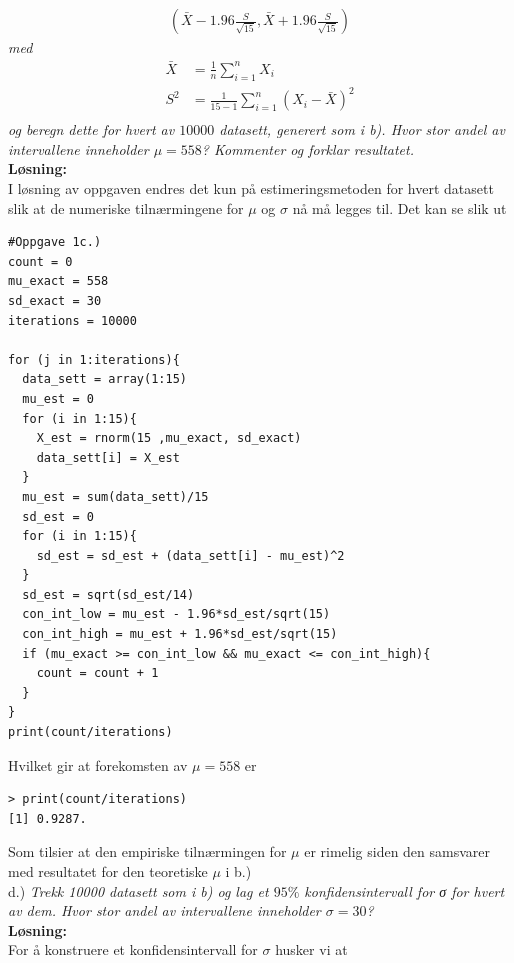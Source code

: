 \documentclass[12pt,
               a4paper,
               article,
               oneside,
               oldfontcommands,
               norsk]{memoir}
\begin{document}
\begin{align*}
    \left(\bar{X} - 1.96\frac{S}{\sqrt{15}},\bar{X} + 1.96\frac{S}{\sqrt{15}}  \right)
\end{align*}
\emph{med}
\begin{align*}
    \bar{X} &= \frac{1}{n} \sum_{i=1}^{n} X_{i} \\[5pt]
    S^2 &= \frac{1}{15 - 1} \sum_{i=1}^{n} \left(X_{i} - \bar{X} \right)^2 \\[5pt]
\end{align*}
\emph{og beregn dette for hvert av $10000$ datasett, generert som i b). Hvor stor andel av intervallene inneholder $\mu = 558$? Kommenter og forklar resultatet.}\vspace{4mm}\\
\textbf{Løsning:}\vspace{4mm}\\ 
I løsning av oppgaven endres det kun på estimeringsmetoden for hvert datasett slik at de numeriske tilnærmingene for $\mu$ og $\sigma$ nå må legges til. Det kan se slik ut 
\begin{lstlisting}
#Oppgave 1c.)
count = 0
mu_exact = 558
sd_exact = 30
iterations = 10000

for (j in 1:iterations){
  data_sett = array(1:15)
  mu_est = 0
  for (i in 1:15){
    X_est = rnorm(15 ,mu_exact, sd_exact)
    data_sett[i] = X_est
  }
  mu_est = sum(data_sett)/15
  sd_est = 0
  for (i in 1:15){
    sd_est = sd_est + (data_sett[i] - mu_est)^2
  }
  sd_est = sqrt(sd_est/14)
  con_int_low = mu_est - 1.96*sd_est/sqrt(15)
  con_int_high = mu_est + 1.96*sd_est/sqrt(15)
  if (mu_exact >= con_int_low && mu_exact <= con_int_high){
    count = count + 1
  }
}
print(count/iterations)
\end{lstlisting}
Hvilket gir at forekomsten av $\mu = 558$ er 
\begin{verbatim}
> print(count/iterations)
[1] 0.9287.
\end{verbatim}
Som tilsier at den empiriske tilnærmingen for $\mu$ er rimelig siden den samsvarer med resultatet for den teoretiske $\mu$ i b.) \vspace{4mm}\\ 
d.) \emph{Trekk 10000 datasett som i b) og lag et $95\%$ konfidensintervall for σ for hvert av dem. Hvor stor andel av intervallene inneholder $\sigma = 30$?}\vspace{4mm}\\
\textbf{Løsning:}\vspace{4mm}\\
For å konstruere et konfidensintervall for $\sigma$ husker vi at 
\end{document}
